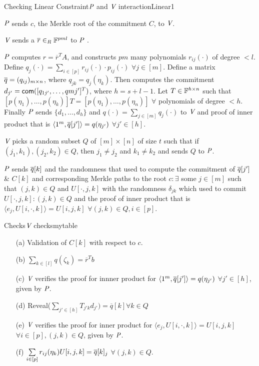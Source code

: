 \begin{protocolbox}{Checking Linear Constraint}{$\P$ and $\V$ interaction}{Linear1}
	\begin{myitemize}
		\item $\P$ sends $c$, the Merkle root of the commitment $C$, to $\V$.
		\item $\V$ sends a $\overline{r}\in_R \bbF^{pml}$ to $\P$ .
		\item $\P$ computes $r=\overline{r}^TA$, and constructs $pm$ many polynomials $r_{ij}(\cdot)$ of degree $<l$. Define $q_j(\cdot) = \sum\limits_{i\in [p]} r_{ij}(\cdot)\cdot p_{ij}(\cdot)$ $\forall j\in [m]$. Define a matrix $\oq=(q_{ij})_{m\times n}$, where $q_{jk}=q_j(\eta_k)$. Then computes the commitment $d_{j'} = \com([q_{1j'}, \ldots, q{mj'}]^T)$, where $h=s+l-1$. Let $T\in \bbF^{h\times n}$ such that $[p(\eta_1), \ldots, p(\eta_k)]T= [p(\eta_1), \ldots, p(\eta_n)]$ $\forall$ polynomials of degree $<h$. Finally $\P$ sends $\{d_1,\ldots, d_h\}$ and $q(\cdot)=\sum\limits_{j\in [m]}q_j(\cdot)$ to $\V$ and proof of inner product that is $\langle 1^m, \oq[j']\rangle=q(\eta_{j'})$ $\forall j'\in [h]$.
		\item $\V$ picks a random subset $Q$ of $[m]\times[n]$ of size $t$ such that if $(j_1,k_1),(j_2,k_2)\in Q$, then $j_1\neq j_2$ and $k_1\neq k_2$ and sends $Q$ to $\P$.
		
		\item $\P$ sends $\oq[k]$ and the randomness that used to compute the commitment of $\oq[j']$ \& $C[k]$ and corresponding Merkle paths to the root $c : \exists$ some $j\in[m]$ such that $(j,k)\in Q$ and $U[\cdot,j,k]$ with the randomness $\delta_{jk}$ which used to commit $U[\cdot,j,k]:(j,k)\in Q$ and the proof of inner product that is $\langle e_j,U[i,\cdot,k]\rangle=U[i,j,k]$ $\forall (j,k)\in Q, i\in [p]$.
	\end{myitemize}
\end{protocolbox}

\begin{algobox}{Checks}{$\V$ checks}{mytable}
	\begin{itemize}
		\item[(a)] Validation of $C[k]$ with respect to $c$. 
		\item[(b)] $\sum\limits_{k\in [l]} q(\zeta_k)=\overline{r}^Tb$
		\item[(c)] $\V$ verifies the proof for innner product for $\langle 1^m, \oq[j']\rangle=q(\eta_{j'})$ $\forall j'\in [h]$, given by $\P$.
		\item[(d)] Reveal($\sum\limits_{j'\in [h]} T_{j'k} d_{j'})=\overline{q}[k] \forall k\in Q$
		\item[(e)] $\V$ verifies the proof for inner product for $\langle e_j, U[i,\cdot,k]\rangle = U[i,j,k]$ $\forall i\in [p], (j,k)\in Q$, given by $\P$.
		\item[(f)] $\sum\limits_{i\in[p]} r_{ij}(\eta_k) U[i,j,k]=\oq[k]_j$ $\forall (j,k)\in Q$.
	\end{itemize}
\end{algobox}

